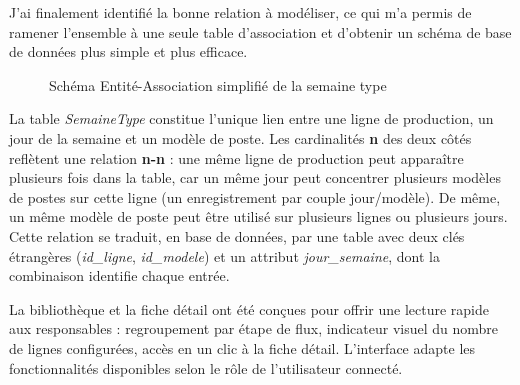 \documentclass[pe1a]{tnreport} %
\begin{document}
J'ai finalement identifié la bonne relation à modéliser, ce qui m'a permis
de ramener l'ensemble à une seule table d'association et d'obtenir un
schéma de base de données plus simple et plus efficace.

\begin{figure}[H]
    \centering
    \caption{Schéma Entité-Association simplifié de la semaine type}
    \label{fig:ea-semaine-type}
\end{figure}

La table \textit{SemaineType} constitue l'unique lien entre une ligne de
production, un jour de la semaine et un modèle de poste. Les cardinalités \textbf{n} des deux côtés reflètent une relation
\textbf{n-n} : une même ligne de production peut apparaître plusieurs fois
dans la table, car un même jour peut concentrer plusieurs modèles de postes
sur cette ligne (un enregistrement par couple jour/modèle). De même, un même
modèle de poste peut être utilisé sur plusieurs lignes ou plusieurs jours.
Cette relation se traduit, en base de données, par une table avec deux clés
étrangères (\textit{id\_ligne}, \textit{id\_modele}) et un attribut
\textit{jour\_semaine}, dont la combinaison identifie chaque entrée.

La bibliothèque et la fiche détail ont été conçues pour offrir une 
lecture rapide aux responsables : regroupement par étape de flux, 
indicateur visuel du nombre de lignes configurées, accès en 
un clic à la fiche détail. L'interface adapte les fonctionnalités 
disponibles selon le rôle de l'utilisateur connecté.
\end{document}
